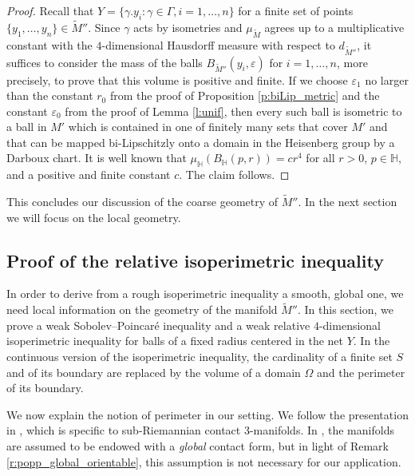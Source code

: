\documentclass[10pt,letterpaper]{amsart}
\theoremstyle{definition}
\numberwithin{thm}{subsection}
\numberwithin{equation}{section}
\begin{document}
\begin{proof}
Recall that $Y= \{\gamma .y_i:\gamma \in \Gamma, i=1,\ldots,n\}$ for a finite set of points $\{y_1,\ldots,y_n\} \in \widetilde{M}''$. Since $\gamma$ acts by isometries and $\mu_{\widetilde{M}}$ agrees up to a multiplicative constant with the $4$-dimensional Hausdorff measure with respect to $d_{\widetilde{M}''}$, it suffices to consider the mass of the balls $B_{\widetilde{M}''}(y_i,\varepsilon)$ for $i=1,\ldots, n$, more precisely, to prove that this volume is positive and finite. If we choose $\varepsilon_1$ no larger than the constant $r_0$ from the proof of Proposition \ref{p:biLip_metric} and the constant $\varepsilon_0$ from the proof of Lemma \ref{l:unif}, then every such ball is isometric to a ball in $M'$ which is contained in one of finitely many sets that cover $M'$ and that can be mapped bi-Lipschitzly onto a domain in the Heisenberg group by a Darboux chart. It is well known that $\mu_{\mathbb H}(B_{\mathbb H}(p,r))=c r^4$ for all $r>0$, $p\in{\mathbb H}$, and a positive and finite constant $c$. The claim follows.
\end{proof}

This concludes our discussion of the coarse geometry of $\widetilde{M}''$. In the next section we will focus on the local geometry.

\subsection{Proof of the relative isoperimetric inequality}
\label{sec:localisoperimetric}

In order to derive from a rough isoperimetric inequality a smooth, global one, we need local information on the geometry of the manifold  $\widetilde{M}''$. In this section, we prove a weak Sobolev--Poincar\'{e} inequality and a weak relative $4$-dimensional isoperimetric inequality for balls of a fixed radius centered in the net $Y$. In the continuous version of the isoperimetric inequality, the cardinality of a finite set $S$ and of its boundary are replaced by the volume of a domain $\Omega$ and the perimeter of its boundary.

We now explain the notion of perimeter in our setting. We follow the presentation in \cite{MR3412382}, which is specific to sub-Riemannian contact $3$-manifolds. In \cite{MR3412382}, the manifolds are assumed to be endowed with a \emph{global} contact form, but in light of Remark \ref{r:popp_global_orientable}, this assumption is not necessary for our application.
\end{document}
